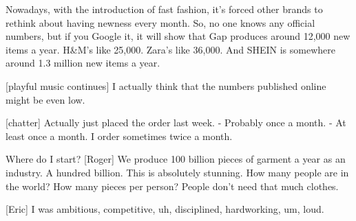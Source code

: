 \documentclass[a4paper]{article}
\begin{document}
	Nowadays, with the introduction of fast fashion, it's forced other brands to rethink about having newness every month.
	So, no one knows any official numbers, but if you Google it, it will show that Gap produces around 12,000 new items a year.
	H\&M's like 25,000.
	Zara's like 36,000.
	And SHEIN is somewhere around 1.3 million new items a year.
	
	
	[playful music continues]
	I actually think that the numbers published online might be even low.

	[chatter]
	Actually just placed the order last week.
	- Probably once a month. 
	- At least once a month.
	I order sometimes twice a month.
	
	
	Where do I start?
	[Roger] We produce 100 billion pieces of garment a year as an industry.
	A hundred billion.
	This is absolutely stunning.
	How many people are in the world?
	How many pieces per person? People don't need that much clothes.

	[Eric] I was ambitious,	competitive, uh, disciplined, hardworking, um, loud.
\end{document}
